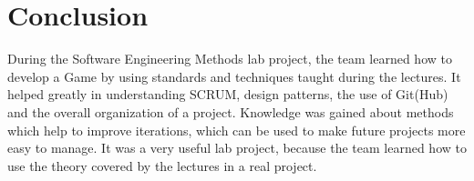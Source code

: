 \documentclass[10pt]{article}
\begin{document}
\newpage
\section*{Conclusion}
During the Software Engineering Methods lab project, the team learned how to develop a Game by using standards and techniques taught during the lectures. It helped greatly in understanding SCRUM, design patterns, the use of Git(Hub) and the overall organization of a project. Knowledge was gained about methods which help to improve iterations, which can be used to make future projects more easy to manage. It was a very useful lab project, because the team learned how to use the theory covered by the lectures in a real project.
\end{document}
